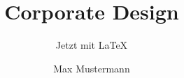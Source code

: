 \documentclass[12pt]{beamer}
\title{Corporate Design}
\subtitle{Jetzt mit \LaTeX}
\author{Max Mustermann}
\begin{document}
\begin{frame}[plain]
  \titlepage
\end{frame}
\end{document}
